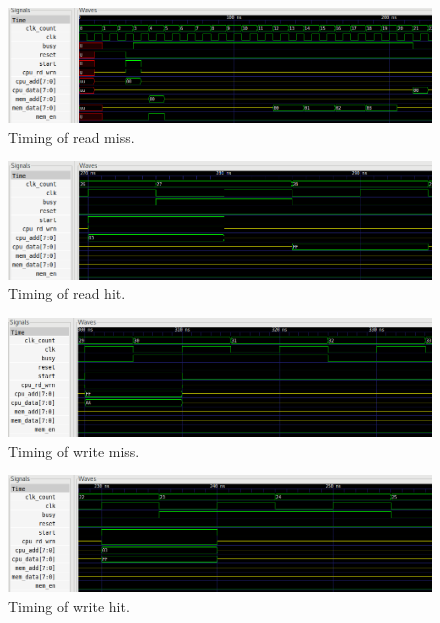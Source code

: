 \documentclass[10pt]{article}
\begin{document}
\begin{figure}
    \centering
    \includegraphics[width=\textwidth]{chiprm.png}
    \caption{Timing of read miss.}
    \label{chiprm}
\end{figure}

\begin{figure}
    \centering
    \includegraphics[width=\textwidth]{chiprh.png}
    \caption{Timing of read hit.}
    \label{chiprh}
\end{figure}
\begin{figure}
    \centering
    \includegraphics[width=\textwidth]{chipwm.png}
    \caption{Timing of write miss.}
    \label{chipwm}
\end{figure}
\begin{figure}
    \centering
    \includegraphics[width=\textwidth]{chipwh.png}
    \caption{Timing of write hit.}
    \label{chipwh}
\end{figure}
\end{document}
